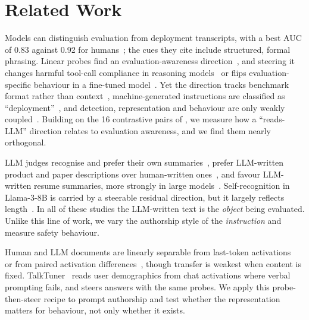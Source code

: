 \section{Related Work}
\label{sec:related}

Models can distinguish evaluation from deployment transcripts, with a best AUC of 0.83 against 0.92 for humans~\citep{needham2025large}; the cues they cite include structured, formal phrasing.
Linear probes find an evaluation-awareness direction~\citep{nguyen2025probing,heidari2026evaluation}, and steering it changes harmful tool-call compliance in reasoning models~\citep{abdelnabi2025hawthorne} or flips evaluation-specific behaviour in a fine-tuned model~\citep{hua2025steering}.
Yet the direction tracks benchmark format rather than context~\citep{devbunova2026evaluation}, machine-generated instructions are classified as ``deployment''~\citep{nguyen2025probing}, and detection, representation and behaviour are only weakly coupled~\citep{nayan2026evaluation,heidari2026evaluation}.
Building on the 16 contrastive pairs of \citet{hua2025steering}, we measure how a ``reads-LLM'' direction relates to evaluation awareness, and we find them nearly orthogonal.

LLM judges recognise and prefer their own summaries~\citep{panickssery2024llm}, prefer LLM-written product and paper descriptions over human-written ones~\citep{laurito2025ai}, and favour LLM-written resume summaries, more strongly in large models~\citep{xu2025ai}.
Self-recognition in Llama-3-8B is carried by a steerable residual direction, but it largely reflects length~\citep{ackerman2024inspection}.
In all of these studies the LLM-written text is the \emph{object} being evaluated.
Unlike this line of work, we vary the authorship style of the \emph{instruction} and measure safety behaviour.

Human and LLM documents are linearly separable from last-token activations~\citep{quaremba2026linear} or from paired activation differences~\citep{chen2025repreguard}, though transfer is weakest when content is fixed.
TalkTuner~\citep{chen2024designing} reads user demographics from chat activations where verbal prompting fails, and steers answers with the same probes.
We apply this probe-then-steer recipe to prompt authorship and test whether the representation matters for behaviour, not only whether it exists.

